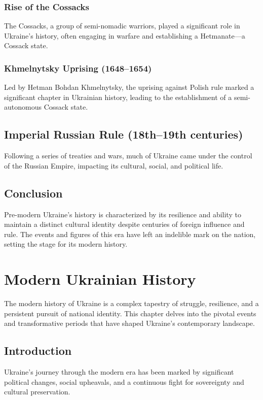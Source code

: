 \documentclass[a4paper,12pt]{book}
\begin{document}
\subsection{Rise of the Cossacks}
The Cossacks, a group of semi-nomadic warriors, played a significant role in Ukraine’s history, often engaging in warfare and establishing a Hetmanate—a Cossack state.

\subsection{Khmelnytsky Uprising (1648–1654)}
Led by Hetman Bohdan Khmelnytsky, the uprising against Polish rule marked a significant chapter in Ukrainian history, leading to the establishment of a semi-autonomous Cossack state.

\section{Imperial Russian Rule (18th–19th centuries)}
\label{sec:imperial-russian-rule}
Following a series of treaties and wars, much of Ukraine came under the control of the Russian Empire, impacting its cultural, social, and political life.

\section{Conclusion}
\label{sec:conclusion-pre-modern-ukraine}
Pre-modern Ukraine’s history is characterized by its resilience and ability to maintain a distinct cultural identity despite centuries of foreign influence and rule. The events and figures of this era have left an indelible mark on the nation, setting the stage for its modern history.

\chapter{Modern Ukrainian History}
\label{ch:modern-ukrainian-history}

The modern history of Ukraine is a complex tapestry of struggle, resilience, and a persistent pursuit of national identity. This chapter delves into the pivotal events and transformative periods that have shaped Ukraine's contemporary landscape.

\section{Introduction}
\label{sec:introduction-modern-ukraine}
Ukraine's journey through the modern era has been marked by significant political changes, social upheavals, and a continuous fight for sovereignty and cultural preservation.
\end{document}
